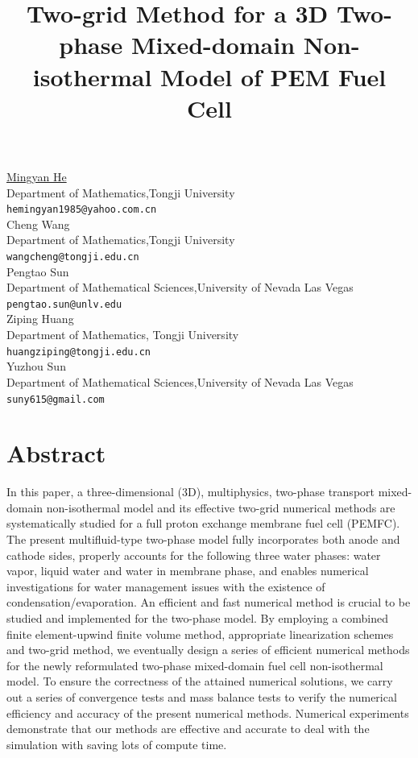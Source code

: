 \documentclass[article, A4, 11pt]{llncs}%
\begin{document}
\title{Two-grid Method for a 3D Two-phase Mixed-domain Non-isothermal Model of PEM Fuel Cell}
 \author{} \institute{}
\maketitle
\begin{center}
{\large \underline{Mingyan He}}\\
Department of Mathematics,Tongji University\\
{\tt hemingyan1985@yahoo.com.cn}
\\ \vspace{4mm}
{\large Cheng Wang}\\
Department of Mathematics,Tongji University\\
{\tt wangcheng@tongji.edu.cn}
\\ \vspace{4mm}
{\large Pengtao Sun}\\
Department of Mathematical Sciences,University of Nevada Las Vegas\\
{\tt pengtao.sun@unlv.edu}
\\ \vspace{4mm}
{\large Ziping Huang}\\
Department of Mathematics, Tongji University\\
{\tt huangziping@tongji.edu.cn}
\\ \vspace{4mm}
{\large Yuzhou Sun}\\
Department of Mathematical Sciences,University of Nevada Las Vegas\\
{\tt suny615@gmail.com}
\end{center}

\section*{Abstract}
In this paper, a three-dimensional (3D), multiphysics, two-phase transport mixed-domain non-isothermal model and its effective two-grid numerical methods are systematically studied for a full proton exchange membrane fuel cell (PEMFC). The present multifluid-type two-phase model fully incorporates both anode and cathode sides, properly accounts for the following three water phases: water vapor, liquid water and water in membrane phase, and enables numerical investigations for water management issues with the existence of condensation/evaporation. An efficient and fast numerical method is crucial to be studied and implemented for the two-phase model. By employing a combined finite element-upwind finite volume method, appropriate linearization schemes and two-grid method, we eventually design a series of efficient numerical methods for the newly reformulated two-phase mixed-domain fuel cell non-isothermal model. To ensure the correctness of the attained numerical solutions, we carry out a series of convergence tests and mass balance tests to verify the numerical efficiency and accuracy of the present numerical methods. Numerical experiments demonstrate that our methods are effective and accurate to deal with the simulation with saving lots of compute time.
\end{document}
